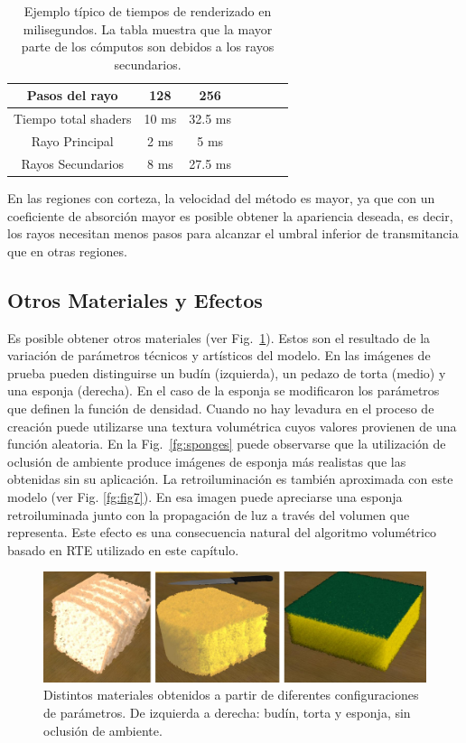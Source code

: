 \begin{table}[htb]
\centering
\begin{tabular}{|c|c|c|c|c|c|c|}
\hline
 Pasos del rayo         & 128 &  256 \\
\hline
\hline
 Tiempo total shaders   & 10 ms &  32.5 ms \\
\hline
 Rayo Principal         & 2 ms  & 5 ms  \\
\hline
 Rayos Secundarios      &  8 ms & 27.5 ms  \\
\hline
\end{tabular}
\caption[Tiempos de renderizado en milisegundos]{Ejemplo típico de tiempos de renderizado en milisegundos. La tabla muestra que la mayor parte de los cómputos son debidos a los rayos secundarios.}
\label{tab:rayossecundarios}
\end{table}


En las regiones con corteza, la velocidad del método es mayor, ya que con un coeficiente de absorción mayor es posible obtener la apariencia deseada, es decir, los rayos necesitan menos pasos para alcanzar el umbral inferior de transmitancia que en otras regiones.

\subsection{Otros Materiales y Efectos}
Es posible obtener otros materiales (ver Fig.~\ref{fg:fig6}).
Estos son el resultado de la variación de parámetros técnicos y artísticos del modelo.
En las imágenes de prueba pueden distinguirse un budín (izquierda), un pedazo de torta (medio) y una esponja (derecha).
En el caso de la esponja se modificaron los parámetros que definen la función de densidad.
Cuando no hay levadura en el proceso de creación puede utilizarse una textura volumétrica cuyos valores provienen de una función aleatoria.
En la Fig.~\ref{fg:sponges} puede observarse que la utilización de oclusión de ambiente produce imágenes de esponja más realistas que las obtenidas sin su aplicación.
La retroiluminación es también aproximada con este modelo (ver Fig. \ref{fg:fig7}).
En esa imagen puede apreciarse una esponja retroiluminada junto con la propagación de luz a través del volumen que representa.
Este efecto es una consecuencia natural del algoritmo volumétrico basado en RTE utilizado en este capítulo.

\begin{figure}[htb!]
  \centerline{\includegraphics[width=13cm]{fig6}}
  \caption[Budín, torta y esponja renderizados]{Distintos materiales obtenidos a partir de diferentes configuraciones de parámetros. De izquierda a derecha: budín, torta y esponja, sin oclusión de ambiente. }
  \label{fg:fig6}

\end{figure}

